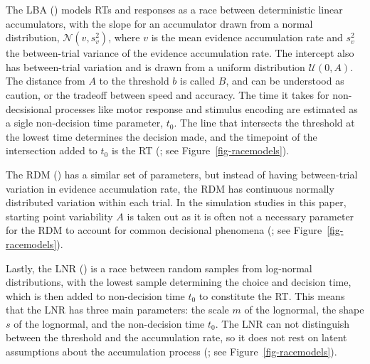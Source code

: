 \documentclass[
  man,
  floatsintext,
  longtable,
  nolmodern,
  notxfonts,
  notimes,
  colorlinks=true,linkcolor=blue,citecolor=blue,urlcolor=blue]{apa7}
\begin{document}
The LBA () models RTs and
responses as a race between deterministic linear accumulators, with the
slope for an accumulator drawn from a normal distribution,
\(\mathcal{N}(v, s_{v}^2)\), where \(v\) is the mean evidence
accumulation rate and \(s_v^2\) the between-trial variance of the
evidence accumulation rate. The intercept also has between-trial
variation and is drawn from a uniform distribution \(\mathcal{U}(0,A)\).
The distance from \(A\) to the threshold \(b\) is called \(B\), and can
be understood as caution, or the tradeoff between speed and accuracy.
The time it takes for non-decsisional processes like motor response and
stimulus encoding are estimated as a sigle non-decision time parameter,
\(t_0\). The line that intersects the threshold at the lowest time
determines the decision made, and the timepoint of the intersection
added to \(t_0\) is the RT (; see Figure~\ref{fig-racemodels}).

The RDM () has a similar set of
parameters, but instead of having between-trial variation in evidence
accumulation rate, the RDM has continuous normally distributed variation
within each trial. In the simulation studies in this paper, starting
point variability \(A\) is taken out as it is often not a necessary
parameter for the RDM to account for common decisional phenomena
(; see
Figure~\ref{fig-racemodels}).

Lastly, the LNR () is a race
between random samples from log-normal distributions, with the lowest
sample determining the choice and decision time, which is then added to
non-decision time \(t_0\) to constitute the RT. This means that the LNR
has three main parameters: the scale \(m\) of the lognormal, the shape
\(s\) of the lognormal, and the non-decision time \(t_0\). The LNR can
not distinguish between the threshold and the accumulation rate, so it
does not rest on latent assumptions about the accumulation process
(; see
Figure~\ref{fig-racemodels}).
\end{document}
